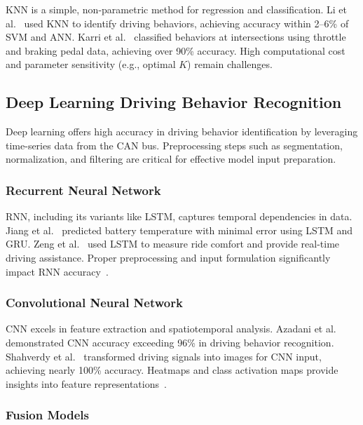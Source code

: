 \gls{KNN} is a simple, non-parametric method for regression and classification. 
Li et al.~\cite{Li2017} used \gls{KNN} to identify driving behaviors, achieving accuracy within 2–6\% of \gls{SVM} and \gls{ANN}. 
Karri et al.~\cite{Karri2021} classified behaviors at intersections using throttle and braking pedal data, achieving over 90\% accuracy. 
High computational cost and parameter sensitivity (e.g., optimal \( K \)) remain challenges.

\subsection{Deep Learning Driving Behavior Recognition}

Deep learning offers high accuracy in driving behavior identification by leveraging time-series data from the CAN bus. 
Preprocessing steps such as segmentation, normalization, and filtering are critical for effective model input preparation.

\subsubsection{Recurrent Neural Network}

\gls{RNN}, including its variants like \gls{LSTM}, captures temporal dependencies in data. 
Jiang et al.~\cite{Jiang2021} predicted battery temperature with minimal error using \gls{LSTM} and \gls{GRU}. 
Zeng et al.~\cite{Zeng2021} used \gls{LSTM} to measure ride comfort and provide real-time driving assistance. 
Proper preprocessing and input formulation significantly impact \gls{RNN} accuracy~\cite{petnehazi2019recurrent}.

\subsubsection{Convolutional Neural Network}

\gls{CNN} excels in feature extraction and spatiotemporal analysis. 
Azadani et al.~\cite{azadani2020performance} demonstrated \gls{CNN} accuracy exceeding 96\% in driving behavior recognition. 
Shahverdy et al.~\cite{Shahverdy2020} transformed driving signals into images for \gls{CNN} input, achieving nearly 100\% accuracy. 
Heatmaps and class activation maps provide insights into feature representations~\cite{Selvaraju2016}.

\subsubsection{Fusion Models}

